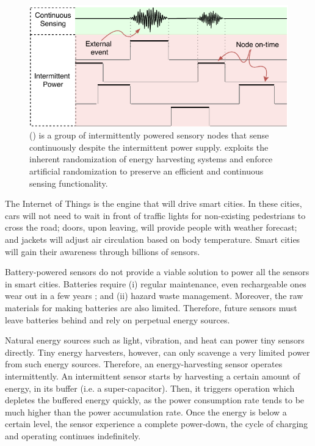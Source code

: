 \begin{figure}
	\centering
	\includegraphics[width=\columnwidth]{figures/coalInterSen}
	\caption{\fullsys (\sys) is a group of intermittently powered sensory nodes that sense continuously despite the intermittent power supply. \sys exploits the inherent randomization of energy harvesting systems and enforce artificial randomization to preserve an efficient and continuous sensing functionality.}
	\label{fig:powerCycle}
\end{figure}

The Internet of Things is the engine that will drive smart cities. In these cities, cars will not need to wait in front of traffic lights for non-existing pedestrians to cross the road; doors, upon leaving, will provide people with weather forecast; and jackets will adjust air circulation based on body temperature. Smart cities will gain their awareness through billions of sensors.

Battery-powered sensors do not provide a viable solution to power all the sensors in smart cities. Batteries require (i) regular maintenance, even rechargeable ones wear out in a few years \cite{xxx}; and (ii) hazard waste management. Moreover, the raw materials for making batteries are also limited. Therefore, future sensors must leave batteries behind and rely on perpetual energy sources. 

Natural energy sources such as light, vibration, and heat can power tiny sensors directly. Tiny energy harvesters, however, can only scavenge a very limited power from such energy sources. Therefore, an energy-harvesting sensor operates intermittently. An intermittent sensor starts by harvesting a certain amount of energy, in its buffer (i.e. a super-capacitor). Then, it triggers operation which depletes the buffered energy quickly, as the power consumption rate tends to be much higher than the power accumulation rate. Once the energy is below a certain level, the sensor experience a complete power-down, the cycle of charging and operating continues indefinitely.

